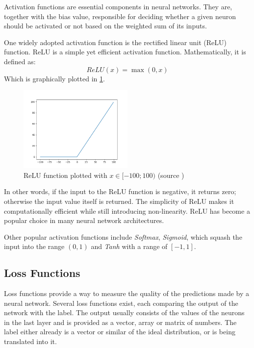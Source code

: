 \documentclass[12pt, a4paper, titlepage]{report}
\begin{document}
Activation functions are essential components in neural networks. They are, together with the bias value, responsible for deciding whether a given neuron should be activated or not based on the weighted sum of its inputs.

One widely adopted activation function is the rectified linear unit (ReLU) function.
ReLU is a simple yet efficient activation function. Mathematically, it is defined as:
\[ ReLU(x) = \max(0, x) \]
Which is graphically plotted in \ref{fig:relu_function}.

\begin{figure}[h]
   \centering
   \includegraphics[width=0.5\textwidth]{../rc/images/graph_relu_function.png}
   \caption{ReLU function plotted with $x \in {[-100; 100)}$ (source \cite{graph_relu_function})}
   \label{fig:relu_function}
\end{figure}

In other words, if the input to the ReLU function is negative, it returns zero; otherwise the input value itself is returned. The simplicity of ReLU makes it computationally efficient while still introducing non-linearity. ReLU has become a popular choice in many neural network architectures.

\vspace{0.5cm}
Other popular activation functions include \emph{Softmax}, \emph{Sigmoid}, which squash the input into the range $(0, 1)$ and \emph{Tanh} with a range of $[-1, 1]$.


\subsection{Loss Functions}

Loss functions provide a way to measure the quality of the predictions made by a neural network. Several loss functions exist, each comparing the output of the network with the label. The output usually consists of the values of the neurons in the last layer and is provided as a vector, array or matrix of numbers. The label either already is a vector or similar of the ideal distribution, or is being translated into it.
\end{document}
